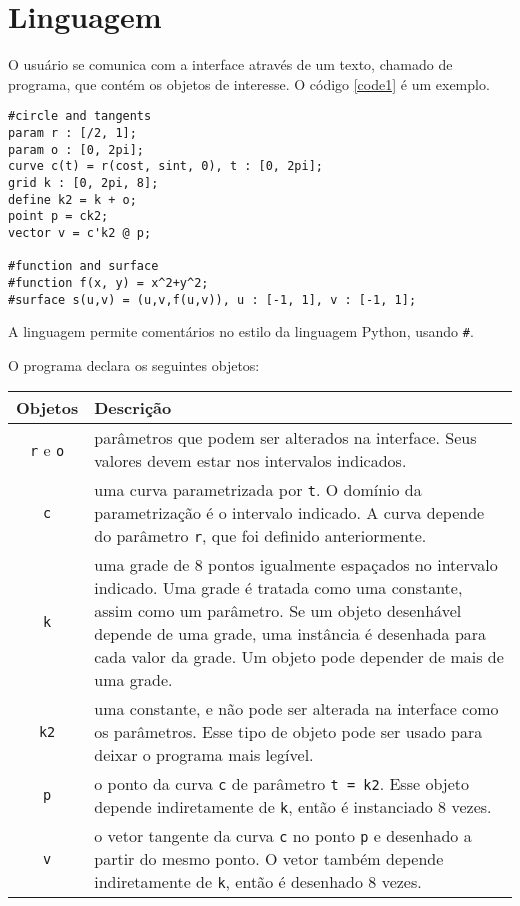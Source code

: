 \chapter{Linguagem}
\label{lang}

O usuário se comunica com a interface através de um texto, chamado de programa,
que contém os objetos de interesse.
O código \ref{code1} é um exemplo.
\begin{lstlisting}[caption=Exemplo de objetos,label=code1]
#circle and tangents
param r : [/2, 1];
param o : [0, 2pi];
curve c(t) = r(cost, sint, 0), t : [0, 2pi];
grid k : [0, 2pi, 8];
define k2 = k + o;
point p = ck2;
vector v = c'k2 @ p;

#function and surface
#function f(x, y) = x^2+y^2;
#surface s(u,v) = (u,v,f(u,v)), u : [-1, 1], v : [-1, 1];
\end{lstlisting}

A linguagem permite comentários no estilo da linguagem Python, usando \texttt{\#}.

O programa declara os seguintes objetos:

\begin{centering}
\begin{tabularx}{\textwidth}{||c|X||}
    \cline{1-2}
    Objetos & Descrição \\ \hline \hline

    \texttt{r} e \texttt{o} & parâmetros que podem ser alterados na interface.
    Seus valores devem estar nos intervalos indicados. \\ \hline

    \texttt{c} & uma curva parametrizada por \texttt{t}.
    O domínio da parametrização é o intervalo indicado.
    A curva depende do parâmetro \texttt{r}, que foi definido anteriormente. \\ \hline

    \texttt{k} & uma grade de 8 pontos igualmente espaçados no intervalo indicado.
    Uma grade é tratada como uma constante, assim como um parâmetro.
    Se um objeto desenhável depende de uma grade, uma instância é desenhada para cada valor da grade.
    Um objeto pode depender de mais de uma grade. \\ \hline

    \texttt{k2} & uma constante, e não pode ser alterada na interface como os parâmetros.
    Esse tipo de objeto pode ser usado para deixar o programa mais legível. \\ \hline

    \texttt{p} & o ponto da curva \texttt{c} de parâmetro \texttt{t = k2}.
    Esse objeto depende indiretamente de \texttt{k}, então é instanciado 8 vezes. \\ \hline

    \texttt{v} & o vetor tangente da curva \texttt{c} no ponto \texttt{p} 
    e desenhado a partir do mesmo ponto.
    O vetor também depende indiretamente de \texttt{k}, então é desenhado 8 vezes. \\ \hline
    \cline{1-2}
\end{tabularx}
\end{centering}

